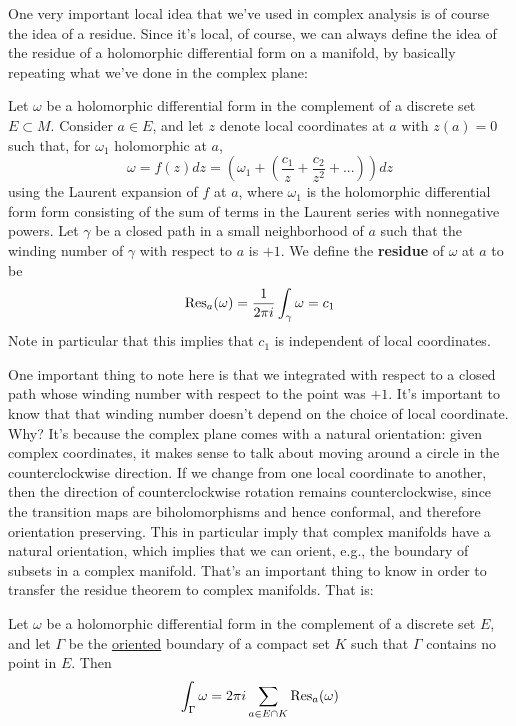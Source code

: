 \documentclass{article}
\begin{document}
One very important local idea that we've used in complex analysis is of course the idea of a residue. Since it's local, of course, we can always define the idea of the residue of a holomorphic differential form on a manifold, by basically repeating what we've done in the complex plane:
\begin{definition}
Let \(\omega\) be a holomorphic differential form in the complement of a discrete set \(E \subset M\). Consider \(a \in E\), and let \(z\) denote local coordinates at \(a\) with \(z(a) = 0\) such that, for \(\omega_1\) holomorphic at \(a\),
\begin{equation}\omega = f(z)dz = \left(\omega_1 + \left(\frac{c_1}{z} + \frac{c_2}{z^2} + ...\right)\right)dz\end{equation}
using the Laurent expansion of \(f\) at \(a\), where \(\omega_1\) is the holomorphic differential form form consisting of the sum of terms in the Laurent series with nonnegative powers. Let \(\gamma\) be a closed path in a small neighborhood of \(a\) such that the winding number of \(\gamma\) with respect to \(a\) is \(+1\). We define the \textbf{residue} of \(\omega\) at \(a\) to be
\begin{equation}\operatorname{Res}_a(\omega) = \frac{1}{2\pi i}\int_\gamma\omega = c_1\end{equation}
Note in particular that this implies that \(c_1\) is independent of local coordinates.
\end{definition}

One important thing to note here is that we integrated with respect to a closed path whose winding number with respect to the point was \(+1\). It's important to know that that winding number doesn't depend on the choice of local coordinate. Why? It's because the complex plane comes with a natural orientation: given complex coordinates, it makes sense to talk about moving around a circle in the counterclockwise direction. If we change from one local coordinate to another, then the direction of counterclockwise rotation remains counterclockwise, since the transition maps are biholomorphisms and hence conformal, and therefore orientation preserving. This in particular imply that complex manifolds have a natural orientation, which implies that we can orient, e.g., the boundary of subsets in a complex manifold. That's an important thing to know in order to transfer the residue theorem to complex manifolds. That is:

\begin{theorem}
Let \(\omega\) be a holomorphic differential form in the complement of a discrete set \(E\), and let \(\Gamma\) be the \underline{oriented} boundary of a compact set \(K\) such that \(\Gamma\) contains no point in \(E\). Then
\begin{equation}\int_\Gamma\omega = 2\pi i \sum_{a \in E \cap K}\operatorname{Res}_a(\omega)\end{equation}
\end{theorem}
\end{document}
